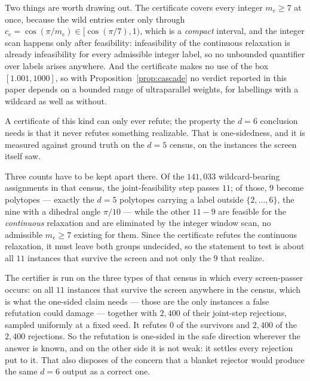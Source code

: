 \documentclass[11pt,reqno]{amsart}
\theoremstyle{plain}
\theoremstyle{definition}
\newcommand{\DFiveWildSurvived}{9}
\newcommand{\DFiveWildCert}{2{,}400}
\newcommand{\DFiveWildScreenPass}{11}
\newcommand{\DFiveWildPassRefuted}{0}
\newcommand{\DFiveWildCensus}{141{,}033}
\newcommand{\DFiveWildJointKilled}{2{,}400}
\begin{document}
Two things are worth drawing out. The certificate covers every integer $m_e\ge 7$
at once, because the wild entries enter only through
$c_e=\cos(\pi/m_e)\in[\cos(\pi/7),1)$, which is a \emph{compact} interval, and the
integer scan happens only after feasibility: infeasibility of the continuous
relaxation is already infeasibility for every admissible integer label, so no
unbounded quantifier over labels arises anywhere. And the certificate makes no use
of the box $[1.001,1000]$, so with Proposition~\ref{prop:cascade} no verdict reported
in this paper depends on a bounded range of ultraparallel weights, for labellings
with a wildcard as well as without.

A certificate of this kind can only ever refute; the property the $d=6$
conclusion needs is that it never refutes something realizable. That is
one-sidedness, and it is measured against ground truth on the $d=5$ census, on the
instances the screen itself saw.

Three counts have to be kept apart there. Of the $\DFiveWildCensus$
wildcard-bearing assignments in that census, the joint-feasibility step passes
$\DFiveWildScreenPass$; of those, $\DFiveWildSurvived$ become polytopes ---
exactly the $d=5$ polytopes carrying a label outside $\{2,\dots,6\}$, the nine with
a dihedral angle $\pi/10$ --- while the other
$\DFiveWildScreenPass-\DFiveWildSurvived$ are feasible for the \emph{continuous}
relaxation and are eliminated by the integer window scan, no admissible $m_e\ge7$
existing for them. Since the certificate refutes the continuous relaxation, it must
leave both groups undecided, so the statement to test is about all
$\DFiveWildScreenPass$ instances that survive the screen and not only the
$\DFiveWildSurvived$ that realize.

The certifier is run on the three types of that census in which every screen-passer
occurs: on all $\DFiveWildScreenPass$ instances that survive the screen anywhere in
the census, which is what the one-sided claim needs --- those are the only instances
a false refutation could damage --- together with $\DFiveWildJointKilled$ of their
joint-step rejections, sampled uniformly at a fixed seed. It refutes
$\DFiveWildPassRefuted$ of the survivors and $\DFiveWildCert$ of the
$\DFiveWildJointKilled$ rejections. So the refutation is one-sided in the safe
direction wherever the answer is known, and on the other side it is not weak: it
settles every rejection put to it. That also disposes of the concern that a blanket
rejector would produce the same $d=6$ output as a correct one.
\end{document}
